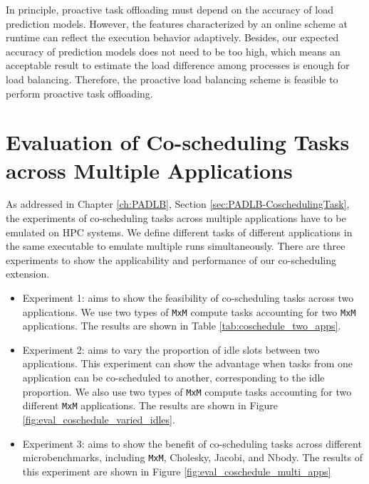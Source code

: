 In principle, proactive task offloading must depend on the accuracy of load prediction models. However, the features characterized by an online scheme at runtime can reflect the execution behavior adaptively. Besides, our expected accuracy of prediction models does not need to be too high, which means an acceptable result to estimate the load difference among processes is enough for load balancing. Therefore, the proactive load balancing scheme is feasible to perform proactive task offloading. 



\section{Evaluation of Co-scheduling Tasks across Multiple Applications} \label{sec:evalulate_coschedule_tasks}

As addressed in Chapter \ref{ch:PADLB}, Section \ref{sec:PADLB-CoschedulingTask}, the experiments of co-scheduling tasks across multiple applications have to be emulated on HPC systems. We define different tasks of different applications in the same executable to emulate multiple runs simultaneously. There are three experiments to show the applicability and performance of our co-scheduling extension.
\begin{itemize}
	\item Experiment 1: aims to show the feasibility of co-scheduling tasks across two applications. We use two types of \texttt{MxM} compute tasks accounting for two \texttt{MxM} applications. The results are shown in Table \ref{tab:coschedule_two_apps}.
	\item Experiment 2: aims to vary the proportion of idle slots between two applications. This experiment can show the advantage when tasks from one application can be co-scheduled to another, corresponding to the idle proportion. We also use two types of \texttt{MxM} compute tasks accounting for two different \texttt{MxM} applications. The results are shown in Figure \ref{fig:eval_coschedule_varied_idles}.
	\item Experiment 3: aims to show the benefit of co-scheduling tasks across different microbenchmarks, including \texttt{MxM}, Cholesky, Jacobi, and Nbody. The results of this experiment are shown in Figure \ref{fig:eval_coschedule_multi_apps}
\end{itemize}


